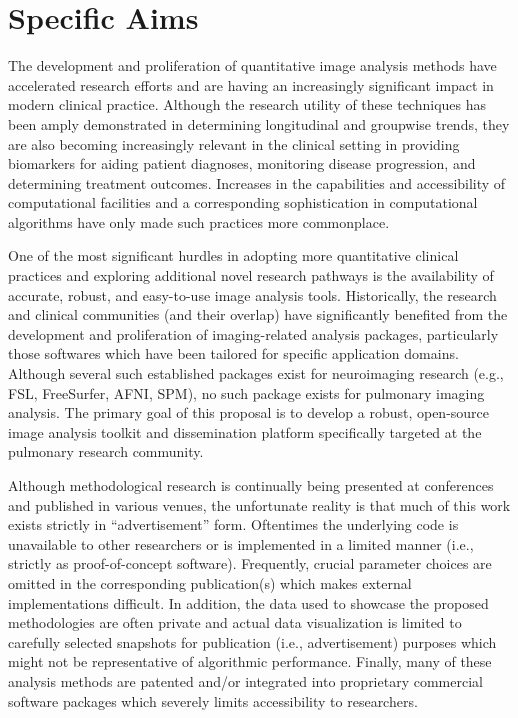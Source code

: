 \documentclass[11pt,]{article}
\title{}
\author{}
\date{}
\begin{document}
\maketitle



\section{Specific Aims}\label{specific-aims}

The development and proliferation of quantitative image analysis methods
have accelerated research efforts and are having an increasingly
significant impact in modern clinical practice. Although the research
utility of these techniques has been amply demonstrated in determining
longitudinal and groupwise trends, they are also becoming increasingly
relevant in the clinical setting in providing biomarkers for aiding
patient diagnoses, monitoring disease progression, and determining
treatment outcomes. Increases in the capabilities and accessibility of
computational facilities and a corresponding sophistication in
computational algorithms have only made such practices more commonplace.

One of the most significant hurdles in adopting more quantitative
clinical practices and exploring additional novel research pathways is
the availability of accurate, robust, and easy-to-use image analysis
tools. Historically, the research and clinical communities (and their
overlap) have significantly benefited from the development and
proliferation of imaging-related analysis packages, particularly those
softwares which have been tailored for specific application domains.
Although several such established packages exist for neuroimaging
research (e.g., FSL, FreeSurfer, AFNI, SPM), no such package exists for
pulmonary imaging analysis. The primary goal of this proposal is to
develop a robust, open-source image analysis toolkit and dissemination
platform specifically targeted at the pulmonary research community.

Although methodological research is continually being presented at
conferences and published in various venues, the unfortunate reality is
that much of this work exists strictly in ``advertisement'' form.
Oftentimes the underlying code is unavailable to other researchers or is
implemented in a limited manner (i.e., strictly as proof-of-concept
software). Frequently, crucial parameter choices are omitted in the
corresponding publication(s) which makes external implementations
difficult. In addition, the data used to showcase the proposed
methodologies are often private and actual data visualization is limited
to carefully selected snapshots for publication (i.e., advertisement)
purposes which might not be representative of algorithmic performance.
Finally, many of these analysis methods are patented and/or integrated
into proprietary commercial software packages which severely limits
accessibility to researchers.
\end{document}
